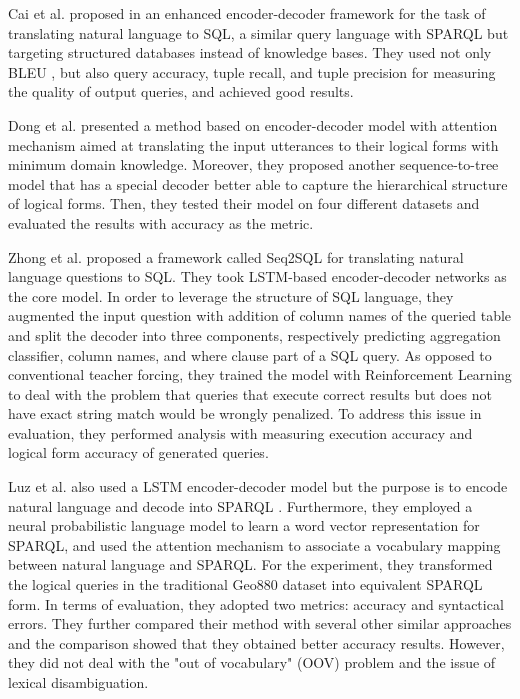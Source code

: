 Cai et al. proposed in \cite{Cai2017} an enhanced encoder-decoder framework for the task of translating natural language to SQL, a similar query language with SPARQL but targeting structured databases instead of knowledge bases. They used not only BLEU \cite{Papineni2002}, but also query accuracy, tuple recall, and tuple precision for measuring the quality of output queries, and achieved good results.

Dong et al. \cite{dong2016language} presented a method based on encoder-decoder model with attention mechanism aimed at translating the input utterances to their logical forms with minimum domain knowledge. Moreover, they proposed another sequence-to-tree model that has a special decoder better able to capture the hierarchical structure of logical forms. Then, they tested their model on four different datasets and evaluated the results with accuracy as the metric.

Zhong et al. \cite{DBLP:journals/corr/abs-1709-00103} proposed a framework called Seq2SQL for translating natural language questions to SQL. They took LSTM-based encoder-decoder networks as the core model. In order to leverage the structure of SQL language, they augmented the input question with addition of column names of the queried table and split the decoder into three components, respectively predicting aggregation classifier, column names, and where clause part of a SQL query. As opposed to conventional teacher forcing, they trained the model with Reinforcement Learning to deal with the problem that queries that execute correct results but does not have exact string match would be wrongly penalized. To address this issue in evaluation, they performed analysis with measuring execution accuracy and logical form accuracy of generated queries.

Luz et al. also used a LSTM encoder-decoder model but the purpose is to encode natural language and decode into SPARQL \cite{Luz2018}. Furthermore, they employed a neural probabilistic language model to learn a word vector representation for SPARQL, and used the attention mechanism to associate a vocabulary mapping between natural language and SPARQL. For the experiment, they transformed the logical queries in the traditional Geo880 dataset into equivalent SPARQL form. In terms of evaluation, they adopted two metrics: accuracy and syntactical errors. They further compared their method with several other similar approaches \cite{alagha2015using} \cite{Kaufmann06querix:a} and the comparison showed that they obtained better accuracy results. However, they did not deal with the "out of vocabulary" (OOV) problem and the issue of lexical disambiguation.

